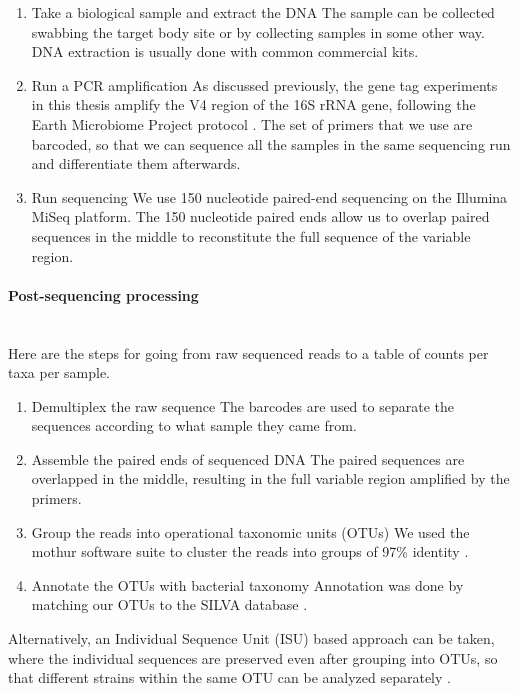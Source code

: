 \begin{enumerate}
\item Take a biological sample and extract the DNA
The sample can be collected swabbing the target body site or by collecting samples in some other way. DNA extraction is usually done with common commercial kits.

\item Run a PCR amplification
As discussed previously, the gene tag experiments in this thesis amplify the V4 region of the 16S rRNA gene, following the Earth Microbiome Project protocol \cite{caporaso2012ultra}. The set of primers that we use are barcoded, so that we can sequence all the samples in the same sequencing run and differentiate them afterwards.

\item Run sequencing
We use 150 nucleotide paired-end sequencing on the Illumina MiSeq platform. The 150 nucleotide paired ends allow us to overlap paired sequences in the middle to reconstitute the full sequence of the variable region.
\end{enumerate}

\paragraph{Post-sequencing processing}\mbox{}\\
Here are the steps for going from raw sequenced reads to a table of counts per taxa per sample.
\begin{enumerate}
\item Demultiplex the raw sequence
The barcodes are used to separate the sequences according to what sample they came from.

\item Assemble the paired ends of sequenced DNA
The paired sequences are overlapped in the middle, resulting in the full variable region amplified by the primers.

\item Group the reads into operational taxonomic units (OTUs)
We used the mothur software suite to cluster the reads into groups of 97\% identity \cite{schloss2009introducing}.

\item Annotate the OTUs with bacterial taxonomy
Annotation was done by  matching our OTUs to the SILVA database \cite{quast2013silva}.
\end{enumerate}

Alternatively, an Individual Sequence Unit (ISU) based approach can be taken, where the individual sequences are preserved even after grouping into OTUs, so that different strains within the same OTU can be analyzed separately \cite{callahan2015dada2}.

